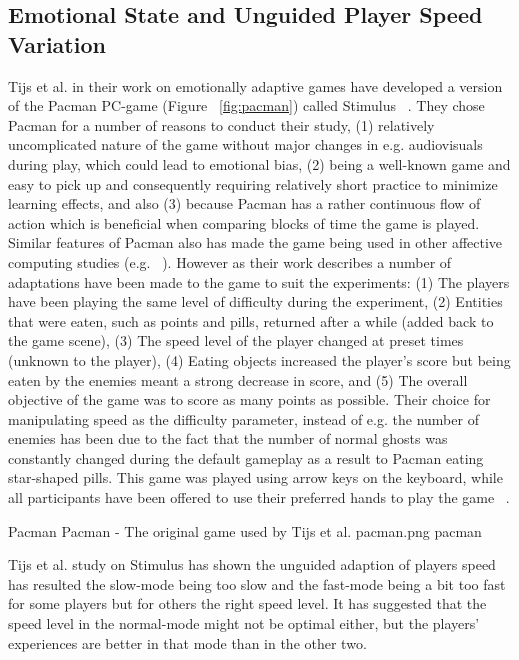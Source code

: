 \subsection{Emotional State and Unguided Player Speed Variation}
Tijs et al. in their work on emotionally adaptive games have developed a version of the Pacman PC-game (Figure ~\ref{fig:pacman}) called Stimulus ~\cite{tijs2009creating}. They chose Pacman for a number of reasons to conduct their study, (1) relatively uncomplicated nature of the game without major changes in e.g. audiovisuals during play, which could lead to emotional bias, (2) being a well-known game and easy to pick up and consequently requiring relatively short practice to minimize learning effects, and also (3) because Pacman has a rather continuous flow of action which is beneficial when comparing blocks of time the game is played. Similar features of Pacman also has made the game being used in other affective computing studies (e.g. ~\cite{yannakakis2007towards}). However as their work describes a number of adaptations have been made to the game to suit the experiments: (1) The players have been playing the same level of difficulty during the experiment, (2) Entities that were eaten, such as points and pills, returned after a while (added back to the game scene), (3) The speed level of the player changed at preset times (unknown to the player), (4) Eating objects increased the player's score but being eaten by the enemies meant a strong decrease in score, and (5) The overall objective of the game was to score as many points as possible. Their choice for manipulating speed as the difficulty parameter, instead of e.g. the number of enemies has been due to the fact that the number of normal ghosts was constantly changed during the default gameplay as a result to Pacman eating star-shaped pills. This game was played using arrow keys on the keyboard, while all participants have been offered to use their preferred hands to play the game ~\cite{tijs2009creating}.

\img
{Pacman}
{Pacman - The original game used by Tijs et al.}
{pacman.png}
{pacman}

Tijs et al. study on Stimulus has shown the unguided adaption of players speed has resulted the slow-mode being too slow and the fast-mode being a bit too fast for some players but for others the right speed level. It has suggested that the speed level in the normal-mode might not be optimal either, but the players' experiences are better in that mode than in the other two.

